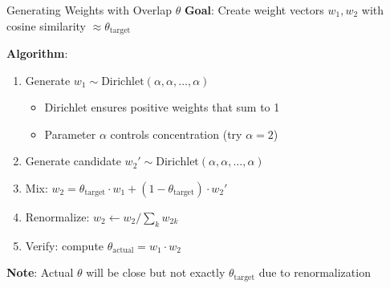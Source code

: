\documentclass{beamer}
\begin{document}
\begin{frame}{Generating Weights with Overlap $\theta$}
\textbf{Goal}: Create weight vectors $w_1, w_2$ with cosine similarity $\approx \theta_{\text{target}}$

\vspace{0.5cm}

\textbf{Algorithm}:
\begin{enumerate}
    \item Generate $w_1 \sim \text{Dirichlet}(\alpha, \alpha, \ldots, \alpha)$
    \begin{itemize}
        \item Dirichlet ensures positive weights that sum to 1
        \item Parameter $\alpha$ controls concentration (try $\alpha = 2$)
    \end{itemize}
    
    \item Generate candidate $w_2' \sim \text{Dirichlet}(\alpha, \alpha, \ldots, \alpha)$
    
    \item Mix: $w_2 = \theta_{\text{target}} \cdot w_1 + (1-\theta_{\text{target}}) \cdot w_2'$
    
    \item Renormalize: $w_2 \leftarrow w_2 / \sum_k w_{2k}$
    
    \item Verify: compute $\theta_{\text{actual}} = w_1 \cdot w_2$
\end{enumerate}

\vspace{0.3cm}

\textbf{Note}: Actual $\theta$ will be close but not exactly $\theta_{\text{target}}$ due to renormalization
\end{frame}
\end{document}
